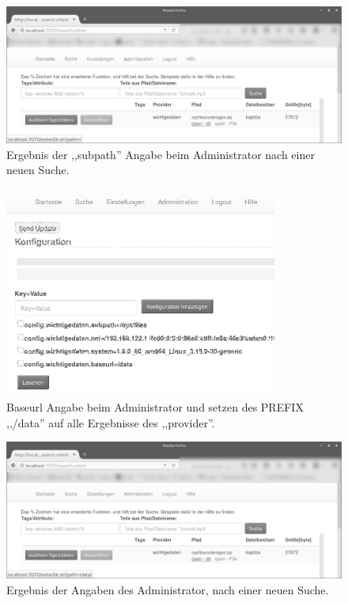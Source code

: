 \documentclass[oneside, ngerman, toc=bibliography,bibliography=totoc,listof=entryprefix, open=right,numbers=noenddot,fontsize=12pt]{scrbook}
\begin{document}
\begin{figure}[htbp] 
    \centering
    \includegraphics[width=\textwidth]{Masterarbeit_Bilder/admin_remove_sub.png}
    \caption{Ergebnis der ,,subpath'' Angabe beim Administrator nach einer neuen Suche.}
    \label{fig:www-subpath_0}
\end{figure}  
\begin{figure}[htbp] 
    \centering
    \includegraphics[width=0.8\textwidth]{Masterarbeit_Bilder/admin_change_mount.png}
    \caption{Baseurl Angabe beim Administrator und setzen des PREFIX ,,/data'' auf alle Ergebnisse des ,,provider''.}
    \label{fig:www-subpath2}
\end{figure}  

\begin{figure}[htbp] 
    \centering
    \includegraphics[width=\textwidth]{Masterarbeit_Bilder/open_mount_dir_0.png}
    \caption{Ergebnis der Angaben des Administrator, nach einer neuen Suche.}
    \label{fig:www-erg}
\end{figure}  
\end{document}

